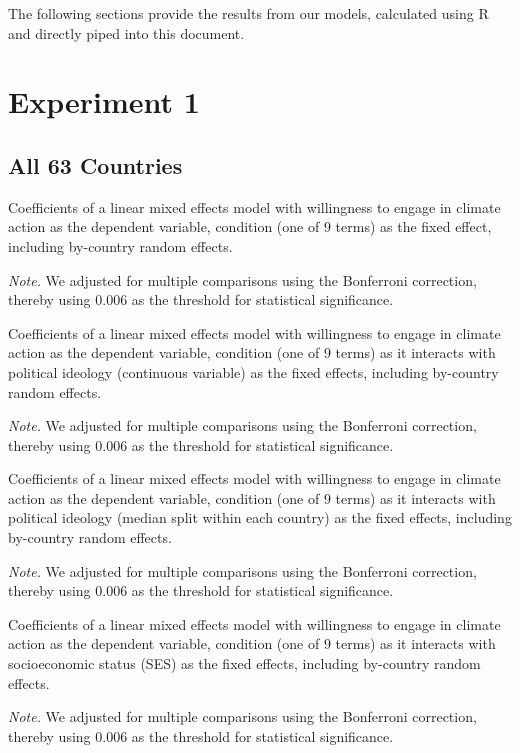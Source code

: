 The following sections provide the results from our models, calculated using R and directly piped into this document.

        \section{Experiment 1}

    \subsection{All 63 Countries}


\begin{table}[H] 
\caption{Coefficients of a linear mixed effects model with willingness to engage in climate action as the dependent variable, condition (one of 9 terms) as the fixed effect, including by-country random effects.}
 
\end{table}
\textit{Note.} We adjusted for multiple comparisons using the Bonferroni correction, thereby using 0.006 as the threshold for statistical significance.

\begin{table}[H] 
\caption{Coefficients of a linear mixed effects model with willingness to engage in climate action as the dependent variable, condition (one of 9 terms) as it interacts with political ideology (continuous variable) as the fixed effects, including by-country random effects.}
 
\end{table}
\textit{Note.} We adjusted for multiple comparisons using the Bonferroni correction, thereby using 0.006 as the threshold for statistical significance.

\begin{table}[H] 
\caption{Coefficients of a linear mixed effects model with willingness to engage in climate action as the dependent variable, condition (one of 9 terms) as it interacts with political ideology (median split within each country) as the fixed effects, including by-country random effects.}
 
\end{table}
\textit{Note.} We adjusted for multiple comparisons using the Bonferroni correction, thereby using 0.006 as the threshold for statistical significance.

\begin{table}[H] 
\caption{Coefficients of a linear mixed effects model with willingness to engage in climate action as the dependent variable, condition (one of 9 terms) as it interacts with socioeconomic status (SES) as the fixed effects, including by-country random effects.}
 
\end{table}
\textit{Note.} We adjusted for multiple comparisons using the Bonferroni correction, thereby using 0.006 as the threshold for statistical significance.

